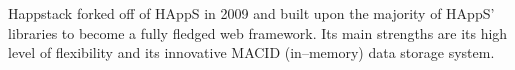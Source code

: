 Happstack forked off of HAppS in 2009 and built upon the majority of HAppS' libraries to become a fully fledged web framework.
Its main strengths are its high level of flexibility and its innovative MACID (in--memory) data storage system.